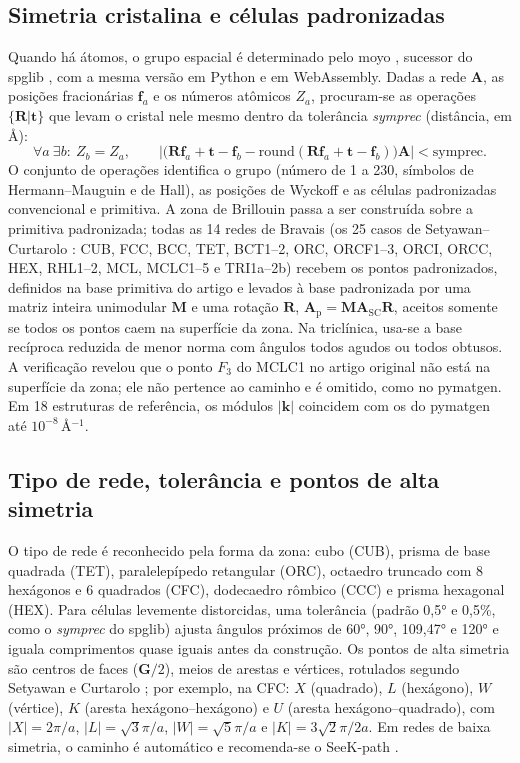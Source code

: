 \documentclass[11pt,a4paper]{article}
\begin{document}
\subsection{Simetria cristalina e células padronizadas}
Quando há átomos, o grupo espacial é determinado pelo moyo \cite{moyo}, sucessor do spglib \cite{togo2024spglib}, com a mesma versão em Python e em WebAssembly. Dadas a rede $\mathbf A$, as posições fracionárias $\mathbf f_a$ e os números atômicos $Z_a$, procuram-se as operações $\{\mathbf R|\mathbf t\}$ que levam o cristal nele mesmo dentro da tolerância \emph{symprec} (distância, em Å):
\begin{equation}
\forall a\ \exists b:\ Z_b=Z_a,\qquad \big|\big(\mathbf R\mathbf f_a+\mathbf t-\mathbf f_b-\mathrm{round}(\mathbf R\mathbf f_a+\mathbf t-\mathbf f_b)\big)\mathbf A\big|<\text{symprec}.
\end{equation}
O conjunto de operações identifica o grupo (número de 1 a 230, símbolos de Hermann--Mauguin e de Hall), as posições de Wyckoff e as células padronizadas convencional e primitiva. A zona de Brillouin passa a ser construída sobre a primitiva padronizada; todas as 14 redes de Bravais (os 25 casos de Setyawan--Curtarolo \cite{setyawan2010}: CUB, FCC, BCC, TET, BCT1--2, ORC, ORCF1--3, ORCI, ORCC, HEX, RHL1--2, MCL, MCLC1--5 e TRI1a--2b) recebem os pontos padronizados, definidos na base primitiva do artigo e levados à base padronizada por uma matriz inteira unimodular $\mathbf M$ e uma rotação $\mathbf R$, $\mathbf A_\mathrm{p}=\mathbf M\mathbf A_\mathrm{SC}\mathbf R$, aceitos somente se todos os pontos caem na superfície da zona. Na triclínica, usa-se a base recíproca reduzida de menor norma com ângulos todos agudos ou todos obtusos. A verificação revelou que o ponto $F_3$ do MCLC1 no artigo original não está na superfície da zona; ele não pertence ao caminho e é omitido, como no pymatgen. Em 18 estruturas de referência, os módulos $|\bm k|$ coincidem com os do pymatgen até $10^{-8}$\,Å$^{-1}$.

\subsection{Tipo de rede, tolerância e pontos de alta simetria}
O tipo de rede é reconhecido pela forma da zona: cubo (CUB), prisma de base quadrada (TET), paralelepípedo retangular (ORC), octaedro truncado com 8 hexágonos e 6 quadrados (CFC), dodecaedro rômbico (CCC) e prisma hexagonal (HEX). Para células levemente distorcidas, uma tolerância (padrão 0,5° e 0,5\%, como o \emph{symprec} do spglib) ajusta ângulos próximos de 60°, 90°, 109,47° e 120° e iguala comprimentos quase iguais antes da construção. Os pontos de alta simetria são centros de faces ($\mathbf G/2$), meios de arestas e vértices, rotulados segundo Setyawan e Curtarolo \cite{setyawan2010}; por exemplo, na CFC: $X$ (quadrado), $L$ (hexágono), $W$ (vértice), $K$ (aresta hexágono–hexágono) e $U$ (aresta hexágono–quadrado), com $|X|=2\pi/a$, $|L|=\sqrt3\pi/a$, $|W|=\sqrt5\pi/a$ e $|K|=3\sqrt2\pi/2a$. Em redes de baixa simetria, o caminho é automático e recomenda-se o SeeK-path \cite{hinuma2017}.
\end{document}
